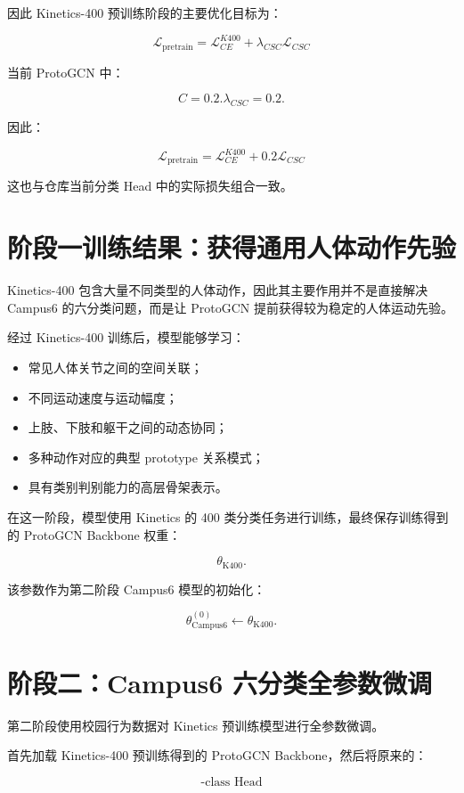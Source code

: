 因此 Kinetics-400 预训练阶段的主要优化目标为：

\[
\boxed{
\mathcal L_{\text{pretrain}}
=
\mathcal L_{CE}^{K400}
+
\lambda_{CSC}
\mathcal L_{CSC}
}
\]

当前 ProtoGCN 中：

\[
C=0.2.\lambda_{CSC}=0.2.
\]

因此：

\[
\boxed{
\mathcal L_{\text{pretrain}}
=
\mathcal L_{CE}^{K400}
+
0.2
\mathcal L_{CSC}
}
\]

这也与仓库当前分类 Head 中的实际损失组合一致。


\section{阶段一训练结果：获得通用人体动作先验}

Kinetics-400 包含大量不同类型的人体动作，因此其主要作用并不是直接解决 Campus6 的六分类问题，而是让 ProtoGCN 提前获得较为稳定的人体运动先验。

经过 Kinetics-400 训练后，模型能够学习：

\begin{itemize}
\item 常见人体关节之间的空间关联；
\item 不同运动速度与运动幅度；
\item 上肢、下肢和躯干之间的动态协同；
\item 多种动作对应的典型 prototype 关系模式；
\item 具有类别判别能力的高层骨架表示。
\end{itemize}

在这一阶段，模型使用 Kinetics 的 400 类分类任务进行训练，最终保存训练得到的 ProtoGCN Backbone 权重：

\[
\theta_{\text{K400}}.
\]

该参数作为第二阶段 Campus6 模型的初始化：

\[
\theta_{\text{Campus6}}^{(0)}
\leftarrow
\theta_{\text{K400}}.
\]


\section{阶段二：Campus6 六分类全参数微调}

第二阶段使用校园行为数据对 Kinetics 预训练模型进行全参数微调。

首先加载 Kinetics-400 预训练得到的 ProtoGCN Backbone，然后将原来的：

\[
\text{-class Head}
\]

